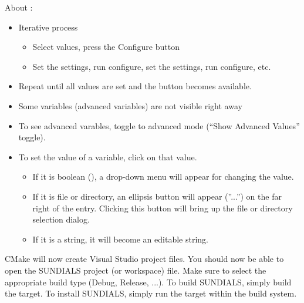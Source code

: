 \documentclass[letterpaper,10pt,english]{sphinxmanual}
\begin{document}
About :
\begin{itemize}
\item {} 
Iterative process
\begin{itemize}
\item {} 
Select values, press the Configure button

\item {} 
Set the settings, run configure, set the settings, run configure,
etc.

\end{itemize}

\item {} 
Repeat until all values are set and the  button becomes available.

\item {} 
Some variables (advanced variables) are not visible right away

\item {} 
To see advanced varables, toggle to advanced mode (``Show Advanced
Values'' toggle).

\item {} 
To set the value of a variable, click on that value.
\begin{itemize}
\item {} 
If it is boolean (), a drop-down menu will appear for
changing the value.

\item {} 
If it is file or directory, an ellipsis button will appear (''...'')
on the far right of the entry.  Clicking this button will bring up
the file or directory selection dialog.

\item {} 
If it is a string, it will become an editable string.

\end{itemize}

\end{itemize}

CMake will now create Visual Studio project files. You should now be
able to open the SUNDIALS project (or workspace) file. Make sure to
select the appropriate build type (Debug, Release, ...). To build
SUNDIALS, simply build the  target. To install SUNDIALS,
simply run the  target within the build system.
\end{document}
